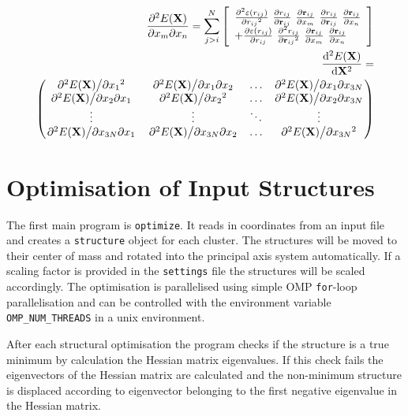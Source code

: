 \begin{align}
    \pdv{E(\mathbf{X})}{x_m}{x_n}=\sum_{j>i}^N\left[  
    \begin{array}{ll}
    \pdv[2]{\varepsilon(r_{ij})}{{r_{ij}}}\  
    \pdv{r_{ij}}{\mathbf{r}_{ij}}\ 
    \pdv{\mathbf{r}_{ij}}{x_m}\ 
    \pdv{r_{ij}}{\mathbf{r}_{ij}}\ 
    \pdv{\mathbf{r}_{ij}}{x_n} \\ 
    +
    \pdv{\varepsilon(r_{ij})}{r_{ij}}\
        \pdv[2]{r_{ij}}{{\mathbf{r}_{ij}}}\ 
    \pdv{\mathbf{r}_{ij}}{x_m}\ 
    \pdv{\mathbf{r}_{ij}}{x_n} 
    \end{array}
    \right]\\
    \begin{aligned}
    \dv[2]{E(\mathbf{X})}{\mathbf{X}}=\\
    \begin{pmatrix}
        \pdv*[2]{E(\mathbf{X})}{{x_1}} & \pdv*{E(\mathbf{X})}{x_1}{x_2} & \ldots & \pdv*{E(\mathbf{X})}{x_1}{x_{3N}}\\
        \pdv*{E(\mathbf{X})}{x_2}{x_1} & \pdv*[2]{E(\mathbf{X})}{{x_2}} & \ldots & \pdv*{E(\mathbf{X})}{x_2}{x_{3N}}\\
        \vdots & \vdots & \ddots & \vdots\\
        \pdv*{E(\mathbf{X})}{x_{3N}}{x_1} & \pdv*{E(\mathbf{X})}{x_{3N}}{x_2} & \ldots & \pdv*[2]{E(\mathbf{X})}{{x_{3N}}}
    \end{pmatrix}
    \end{aligned}
\end{align}

\section{Optimisation of Input Structures}
\label{sec:optimisationofinputstructures}

The first main program is \verb|optimize|. It reads in coordinates from an
input file and creates a \verb|structure| object for each cluster. The
structures will be moved to their center of mass and rotated into the principal
axis system automatically. If a scaling factor is provided in the
\verb|settings| file the structures will be scaled accordingly.  The
optimisation is parallelised using simple \ac{OMP} \verb|for|-loop
parallelisation and can be controlled with the environment variable
\verb|OMP_NUM_THREADS| in a unix environment.

After each structural optimisation the program checks if the structure is a
true minimum by calculation the Hessian matrix eigenvalues. If this check fails
the eigenvectors of the Hessian matrix are calculated and the non-minimum
structure is displaced according to eigenvector belonging to the first negative
eigenvalue in the Hessian matrix.

